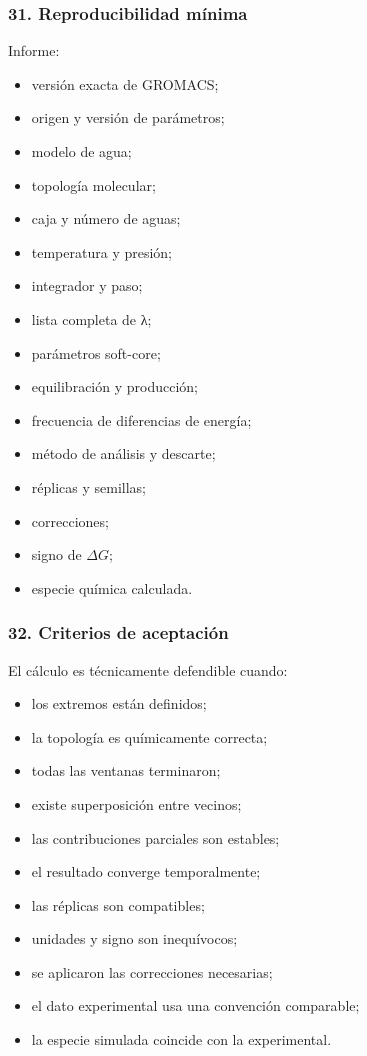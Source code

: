 \documentclass[
  spanish,
  11pt,
  a4paper]{article}
\providecommand{\tightlist}{%
  \setlength{\itemsep}{0pt}\setlength{\parskip}{0pt}}
\begin{document}
\subsubsection{31. Reproducibilidad
mínima}\label{reproducibilidad-muxednima}

Informe:

\begin{itemize}
\tightlist
\item
  versión exacta de GROMACS;
\item
  origen y versión de parámetros;
\item
  modelo de agua;
\item
  topología molecular;
\item
  caja y número de aguas;
\item
  temperatura y presión;
\item
  integrador y paso;
\item
  lista completa de λ;
\item
  parámetros soft-core;
\item
  equilibración y producción;
\item
  frecuencia de diferencias de energía;
\item
  método de análisis y descarte;
\item
  réplicas y semillas;
\item
  correcciones;
\item
  signo de \(\Delta G\);
\item
  especie química calculada.
\end{itemize}

\subsubsection{32. Criterios de
aceptación}\label{criterios-de-aceptaciuxf3n}

El cálculo es técnicamente defendible cuando:

\begin{itemize}
\tightlist
\item
  los extremos están definidos;
\item
  la topología es químicamente correcta;
\item
  todas las ventanas terminaron;
\item
  existe superposición entre vecinos;
\item
  las contribuciones parciales son estables;
\item
  el resultado converge temporalmente;
\item
  las réplicas son compatibles;
\item
  unidades y signo son inequívocos;
\item
  se aplicaron las correcciones necesarias;
\item
  el dato experimental usa una convención comparable;
\item
  la especie simulada coincide con la experimental.
\end{itemize}
\end{document}

